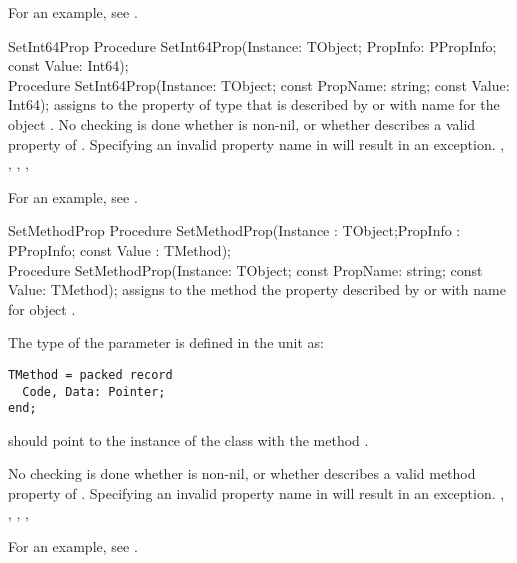 For an example, see .


\begin{procedure}{SetInt64Prop}
\Declaration
Procedure SetInt64Prop(Instance: TObject; PropInfo: PPropInfo; const Value: Int64);\\
Procedure SetInt64Prop(Instance: TObject; const PropName: string; const Value: Int64);
\Description
{} assigns  to the property of type
 that is described by  or with name  
for the object .
\Errors
No checking is done whether  is non-nil, or whether
 describes a valid  property of .
Specifying an invalid property name in  will result in an
 exception.
\SeeAlso
{}, , , ,
\end{procedure}

For an example, see .


\begin{procedure}{SetMethodProp}
\Declaration
Procedure SetMethodProp(Instance : TObject;PropInfo : PPropInfo; const Value :
TMethod);\\
Procedure SetMethodProp(Instance: TObject; const PropName: string; const Value: TMethod);
\Description
{} assigns  to the method the property described 
by  or with name  for object .

The type  of the  parameter is defined in the
 unit as:
\begin{verbatim}
TMethod = packed record
  Code, Data: Pointer;
end;                                                                         
\end{verbatim}
 should point to the instance of the class with the method .

\Errors
No checking is done whether  is non-nil, or whether
 describes a valid method property of .
Specifying an invalid property name in  will result in an
 exception.
\SeeAlso
{}, , ,
, 
\end{procedure}

For an example, see .



